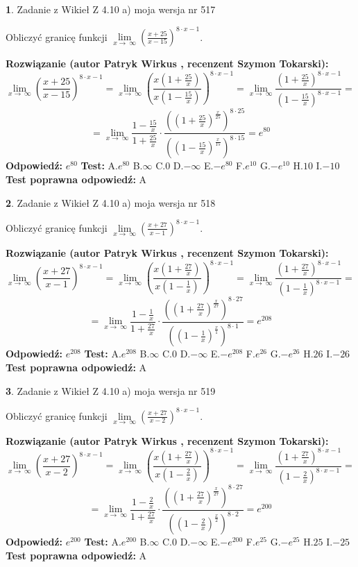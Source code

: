 \documentclass[12pt, a4paper]{article}
\theoremstyle{definition} %
\newtheorem{zad}{}
\newcommand{\zadStart}[1]{\begin{zad}#1\newline}
\newcommand{\zadStop}{\end{zad}}
\newcommand{\rozwStart}[2]{\noindent \textbf{Rozwiązanie (autor #1 , recenzent #2): }\newline}
\newcommand{\rozwStop}{\newline}
\newcommand{\odpStart}{\noindent \textbf{Odpowiedź:}\newline}
\newcommand{\odpStop}{\newline}
\newcommand{\testStart}{\noindent \textbf{Test:}\newline}
\newcommand{\testStop}{\newline}
\newcommand{\kluczStart}{\noindent \textbf{Test poprawna odpowiedź:}\newline}
\newcommand{\kluczStop}{\newline}
\begin{document}
\zadStart{Zadanie z Wikieł Z 4.10 a) moja wersja nr 517}

Obliczyć granicę funkcji  $\lim\limits_{x\to\ \infty}(\frac{x+25}{x-15})^{8\cdot x-1}$.
\zadStop
\rozwStart{Patryk Wirkus}{Szymon Tokarski}
$$\lim\limits_{x\to\ \infty}(\frac{x+25}{x-15})^{8\cdot x-1} = \lim\limits_{x\to\ \infty}(\frac{x(1+\frac{25}{x})}{x(1-\frac{15}{x})})^{8\cdot x-1}=\lim\limits_{x\to\ \infty}\frac{(1+\frac{25}{x})^{8\cdot x-1}}{(1-\frac{15}{x})^{8\cdot x-1}}=$$
$$=\lim\limits_{x\to\ \infty}\frac{1-\frac{15}{x}}{1+\frac{25}{x}}\cdot\frac{((1+\frac{25}{x})^{\frac{x}{25}})^{8\cdot25}}{((1-\frac{15}{x})^{\frac{x}{15}})^{8\cdot15}}=e^{80}$$
\rozwStop
\odpStart
$e^{80}$
\odpStop
\testStart
A.$e^{80}$ B.$\infty$ C.$0$ D.$-\infty$ E.$-e^{80}$
F.$e^{10}$ G.$-e^{10}$
H.$10$
I.$-10$
\testStop
\kluczStart
A
\kluczStop



\zadStart{Zadanie z Wikieł Z 4.10 a) moja wersja nr 518}

Obliczyć granicę funkcji  $\lim\limits_{x\to\ \infty}(\frac{x+27}{x-1})^{8\cdot x-1}$.
\zadStop
\rozwStart{Patryk Wirkus}{Szymon Tokarski}
$$\lim\limits_{x\to\ \infty}(\frac{x+27}{x-1})^{8\cdot x-1} = \lim\limits_{x\to\ \infty}(\frac{x(1+\frac{27}{x})}{x(1-\frac{1}{x})})^{8\cdot x-1}=\lim\limits_{x\to\ \infty}\frac{(1+\frac{27}{x})^{8\cdot x-1}}{(1-\frac{1}{x})^{8\cdot x-1}}=$$
$$=\lim\limits_{x\to\ \infty}\frac{1-\frac{1}{x}}{1+\frac{27}{x}}\cdot\frac{((1+\frac{27}{x})^{\frac{x}{27}})^{8\cdot27}}{((1-\frac{1}{x})^{\frac{x}{1}})^{8\cdot1}}=e^{208}$$
\rozwStop
\odpStart
$e^{208}$
\odpStop
\testStart
A.$e^{208}$ B.$\infty$ C.$0$ D.$-\infty$ E.$-e^{208}$
F.$e^{26}$ G.$-e^{26}$
H.$26$
I.$-26$
\testStop
\kluczStart
A
\kluczStop



\zadStart{Zadanie z Wikieł Z 4.10 a) moja wersja nr 519}

Obliczyć granicę funkcji  $\lim\limits_{x\to\ \infty}(\frac{x+27}{x-2})^{8\cdot x-1}$.
\zadStop
\rozwStart{Patryk Wirkus}{Szymon Tokarski}
$$\lim\limits_{x\to\ \infty}(\frac{x+27}{x-2})^{8\cdot x-1} = \lim\limits_{x\to\ \infty}(\frac{x(1+\frac{27}{x})}{x(1-\frac{2}{x})})^{8\cdot x-1}=\lim\limits_{x\to\ \infty}\frac{(1+\frac{27}{x})^{8\cdot x-1}}{(1-\frac{2}{x})^{8\cdot x-1}}=$$
$$=\lim\limits_{x\to\ \infty}\frac{1-\frac{2}{x}}{1+\frac{27}{x}}\cdot\frac{((1+\frac{27}{x})^{\frac{x}{27}})^{8\cdot27}}{((1-\frac{2}{x})^{\frac{x}{2}})^{8\cdot2}}=e^{200}$$
\rozwStop
\odpStart
$e^{200}$
\odpStop
\testStart
A.$e^{200}$ B.$\infty$ C.$0$ D.$-\infty$ E.$-e^{200}$
F.$e^{25}$ G.$-e^{25}$
H.$25$
I.$-25$
\testStop
\kluczStart
A
\kluczStop
\end{document}
